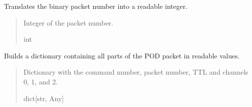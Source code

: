 \documentclass[letterpaper,10pt,english]{sphinxmanual}
\begin{document}
\begin{fulllineitems}
\begin{fulllineitems}
\begin{quote}
\begin{description}
\end{description}\end{quote}

\end{fulllineitems}


\begin{fulllineitems}
\label{\detokenize{PodApi.Packets:PodApi.Packets.Binary4.PacketBinary4.PacketNumber}}
\pysigstartsignatures
{}
\pysigstopsignatures
\sphinxAtStartPar
Translates the binary packet number into a readable integer.
\begin{quote}\begin{description}
\sphinxAtStartPar
Integer of the packet number.

\sphinxAtStartPar
int

\end{description}\end{quote}

\end{fulllineitems}


\begin{fulllineitems}
\label{\detokenize{PodApi.Packets:PodApi.Packets.Binary4.PacketBinary4.TranslateAll}}
\pysigstartsignatures
{}
\pysigstopsignatures
\sphinxAtStartPar
Builds a dictionary containing all parts of the POD packet in readable values.
\begin{quote}\begin{description}
\sphinxAtStartPar
Dictionary with the command number, packet number, TTL                 and channels 0, 1, and 2.

\sphinxAtStartPar
dict{[}str, Any{]}

\end{description}\end{quote}

\end{fulllineitems}


\end{fulllineitems}
\end{document}
